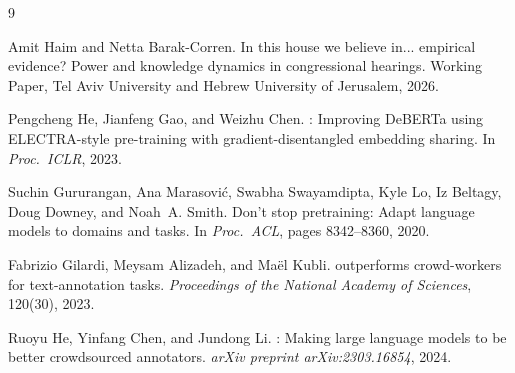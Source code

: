 \documentclass[11pt,a4paper]{article}
\begin{document}
\begin{thebibliography}{9}

Amit Haim and Netta Barak-Corren.
\newblock In this house we believe in... empirical evidence? {P}ower and knowledge dynamics in congressional hearings.
\newblock Working Paper, Tel Aviv University and Hebrew University of Jerusalem, 2026.

Pengcheng He, Jianfeng Gao, and Weizhu Chen.
: Improving {DeBERTa} using {ELECTRA}-style pre-training with gradient-disentangled embedding sharing.
\newblock In \emph{Proc.\ ICLR}, 2023.

Suchin Gururangan, Ana Marasovi{\'c}, Swabha Swayamdipta, Kyle Lo, Iz Beltagy, Doug Downey, and Noah~A. Smith.
\newblock Don't stop pretraining: Adapt language models to domains and tasks.
\newblock In \emph{Proc.\ ACL}, pages 8342--8360, 2020.

Fabrizio Gilardi, Meysam Alizadeh, and Ma{\"e}l Kubli.
 outperforms crowd-workers for text-annotation tasks.
\newblock \emph{Proceedings of the National Academy of Sciences}, 120(30), 2023.

Ruoyu He, Yinfang Chen, and Jundong Li.
: Making large language models to be better crowdsourced annotators.
\newblock \emph{arXiv preprint arXiv:2303.16854}, 2024.

\end{thebibliography}
\end{document}
